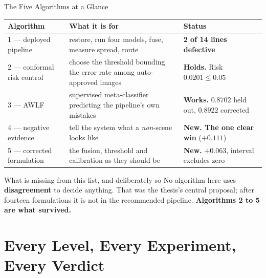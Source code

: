 \documentclass[aspectratio=169,11pt]{beamer}
\begin{document}
\begin{frame}{The Five Algorithms at a Glance}
\tiny
\begin{center}
\begin{tabular}{@{}l p{5.4cm} l@{}}
\toprule
\textbf{Algorithm} & \textbf{What it is for} & \textbf{Status} \\
\midrule
1 --- deployed pipeline & restore, run four models, fuse, measure spread, route & \textbf{2 of 14 lines defective} \\[1pt]
2 --- conformal risk control & choose the threshold bounding the error rate among auto-approved images & \textbf{Holds.} Risk $0.0201 \le 0.05$ \\[1pt]
3 --- AWLF & supervised meta-classifier predicting the pipeline's own mistakes & \textbf{Works.} $0.8702$ held out, $0.8922$ corrected \\[1pt]
4 --- negative evidence & tell the system what a \emph{non}-scene looks like & \textbf{New. The one clear win} ($+0.111$) \\
5 --- corrected formulation & the fusion, threshold and calibration as they should be & \textbf{New.} $+0.063$, interval excludes zero \\
\bottomrule
\end{tabular}
\end{center}
\vspace{1mm}
\begin{alertblock}{\small What is missing from this list, and deliberately so}
\footnotesize No algorithm here uses \textbf{disagreement} to decide anything. That was the thesis's central proposal; after fourteen formulations it is not in the recommended pipeline. \textbf{Algorithms 2 to 5 are what survived.}
\end{alertblock}
\end{frame}

\section{Every Level, Every Experiment, Every Verdict}
\end{document}
